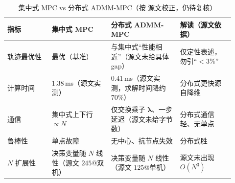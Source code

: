 \begin{table}[H]\centering\small
\caption{集中式 MPC vs 分布式 ADMM-MPC（按 \cite{kim2023layered} 源文校正，仍待复核）}
\label{tab:dmpc-cent-vs-dist}
\begin{tabular}{p{0.18\linewidth}p{0.24\linewidth}p{0.28\linewidth}p{0.22\linewidth}}
\toprule
指标 & 集中式 MPC & 分布式 ADMM-MPC & 解读（源文依据） \\
\midrule
轨迹最优性 & 最优（基准） & 与集中式“性能相近”（源文未给具体 gap） & 仅定性表述，勿引“$<3\%$” \\
计算时间 & $1.38$\,ms（源文实测） & $0.41$\,ms（源文实测，求解时间降约 $70\%$） & 分布式更快源自降维 \\
通信 & 集中式上下行 $\propto N$ & 仅交换乘子 $\boldsymbol{\lambda}$、一步延迟（源文未给字节数） & 分布式通信轻、无单点 \\
鲁棒性 & 单点故障 & 无中心、抗节点失效 & 分布式胜 \\
$N$ 扩展性 & 决策变量随 $N$ 线性（源文 $245$@双机） & 决策变量随 $N$ 线性（源文 $125$@单机） & 源文未出现 $O(N^3)$ \\
\bottomrule
\end{tabular}
\end{table}

